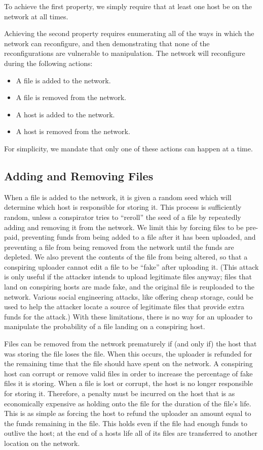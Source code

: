 \documentclass[twocolumn]{article}
\begin{document}
To achieve the first property, we simply require that at least one host be on the network at all times.

Achieving the second property requires enumerating all of the ways in which the network can reconfigure, and then demonstrating that none of the reconfigurations are vulnerable to manipulation.
The network will reconfigure during the following actions:
\begin{itemize}
	\item A file is added to the network.
	\item A file is removed from the network.
	\item A host is added to the network.
	\item A host is removed from the network.
\end{itemize}
For simplicity, we mandate that only one of these actions can happen at a time.

\subsection{Adding and Removing Files}
When a file is added to the network, it is given a random seed which will determine which host is responsible for storing it.
This process is sufficiently random, unless a conspirator tries to ``reroll'' the seed of a file by repeatedly adding and removing it from the network.
We limit this by forcing files to be pre-paid, preventing funds from being added to a file after it has been uploaded, and preventing a file from being removed from the network until the funds are depleted.
We also prevent the contents of the file from being altered, so that a conspiring uploader cannot edit a file to be ``fake'' after uploading it.
(This attack is only useful if the attacker intends to upload legitimate files anyway; files that land on conspiring hosts are made fake, and the original file is reuploaded to the network. Various social engineering attacks, like offering cheap storage, could be used to help the attacker locate a source of legitimate files that provide extra funds for the attack.)
With these limitations, there is no way for an uploader to manipulate the probability of a file landing on a conspiring host.

Files can be removed from the network prematurely if (and only if) the host that was storing the file loses the file.
When this occurs, the uploader is refunded for the remaining time that the file should have spent on the network.
A conspiring host can corrupt or remove valid files in order to increase the percentage of fake files it is storing.
When a file is lost or corrupt, the host is no longer responsible for storing it.
Therefore, a penalty must be incurred on the host that is as economically expensive as holding onto the file for the duration of the file's life.
This is as simple as forcing the host to refund the uploader an amount equal to the funds remaining in the file.
This holds even if the file had enough funds to outlive the host; at the end of a hosts life all of its files are transferred to another location on the network.
\end{document}
